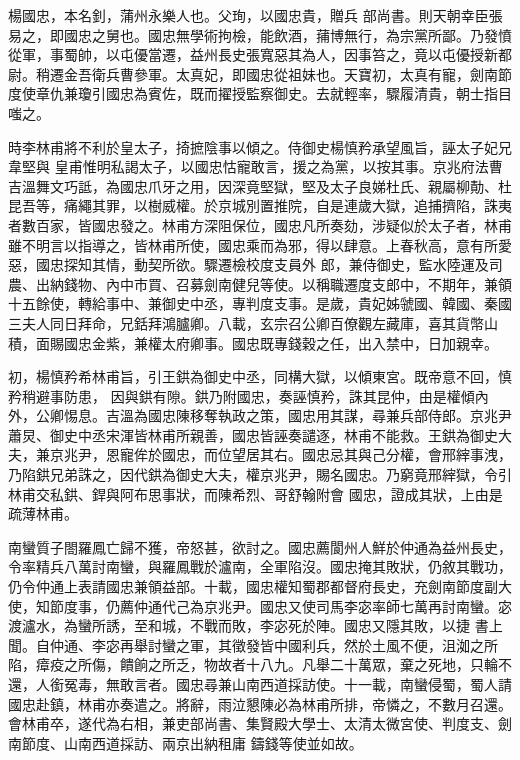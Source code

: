 \begin{pinyinscope}
 楊國忠，本名釗，蒲州永樂人也。父珣，以國忠貴，贈兵
 部尚書。則天朝幸臣張易之，即國忠之舅也。國忠無學術拘檢，能飲酒，蒱博無行，為宗黨所鄙。乃發憤從軍，事蜀帥，以屯優當遷，益州長史張寬惡其為人，因事笞之，竟以屯優授新都尉。稍遷金吾衛兵曹參軍。太真妃，即國忠從祖妹也。天寶初，太真有寵，劍南節度使章仇兼瓊引國忠為賓佐，既而擢授監察御史。去就輕率，驟履清貴，朝士指目嗤之。



 時李林甫將不利於皇太子，掎摭陰事以傾之。侍御史楊慎矜承望風旨，誣太子妃兄韋堅與
 皇甫惟明私謁太子，以國忠怙寵敢言，援之為黨，以按其事。京兆府法曹吉溫舞文巧詆，為國忠爪牙之用，因深竟堅獄，堅及太子良娣杜氏、親屬柳勣、杜昆吾等，痛繩其罪，以樹威權。於京城別置推院，自是連歲大獄，追捕擠陷，誅夷者數百家，皆國忠發之。林甫方深阻保位，國忠凡所奏劾，涉疑似於太子者，林甫雖不明言以指導之，皆林甫所使，國忠乘而為邪，得以肆意。上春秋高，意有所愛惡，國忠探知其情，動契所欲。驟遷檢校度支員外
 郎，兼侍御史，監水陸運及司農、出納錢物、內中市買、召募劍南健兒等使。以稱職遷度支郎中，不期年，兼領十五餘使，轉給事中、兼御史中丞，專判度支事。是歲，貴妃姊虢國、韓國、秦國三夫人同日拜命，兄銛拜鴻臚卿。八載，玄宗召公卿百僚觀左藏庫，喜其貨幣山積，面賜國忠金紫，兼權太府卿事。國忠既專錢穀之任，出入禁中，日加親幸。



 初，楊慎矜希林甫旨，引王鉷為御史中丞，同構大獄，以傾東宮。既帝意不回，慎矜稍避事防患，
 因與鉷有隙。鉷乃附國忠，奏誣慎矜，誅其昆仲，由是權傾內外，公卿惕息。吉溫為國忠陳移奪執政之策，國忠用其謀，尋兼兵部侍郎。京兆尹蕭炅、御史中丞宋渾皆林甫所親善，國忠皆誣奏譴逐，林甫不能救。王鉷為御史大夫，兼京兆尹，恩寵侔於國忠，而位望居其右。國忠忌其與己分權，會邢縡事洩，乃陷鉷兄弟誅之，因代鉷為御史大夫，權京兆尹，賜名國忠。乃窮竟邢縡獄，令引林甫交私鉷、銲與阿布思事狀，而陳希烈、哥舒翰附會
 國忠，證成其狀，上由是疏薄林甫。



 南蠻質子閤羅鳳亡歸不獲，帝怒甚，欲討之。國忠薦閬州人鮮於仲通為益州長史，令率精兵八萬討南蠻，與羅鳳戰於瀘南，全軍陷沒。國忠掩其敗狀，仍敘其戰功，仍令仲通上表請國忠兼領益部。十載，國忠權知蜀郡都督府長史，充劍南節度副大使，知節度事，仍薦仲通代己為京兆尹。國忠又使司馬李宓率師七萬再討南蠻。宓渡瀘水，為蠻所誘，至和城，不戰而敗，李宓死於陣。國忠又隱其敗，以捷
 書上聞。自仲通、李宓再舉討蠻之軍，其徵發皆中國利兵，然於土風不便，沮洳之所陷，瘴疫之所傷，饋餉之所乏，物故者十八九。凡舉二十萬眾，棄之死地，只輪不還，人銜冤毒，無敢言者。國忠尋兼山南西道採訪使。十一載，南蠻侵蜀，蜀人請國忠赴鎮，林甫亦奏遣之。將辭，雨泣懇陳必為林甫所排，帝憐之，不數月召還。會林甫卒，遂代為右相，兼吏部尚書、集賢殿大學士、太清太微宮使、判度支、劍南節度、山南西道採訪、兩京出納租庸
 鑄錢等使並如故。




\end{pinyinscope}
